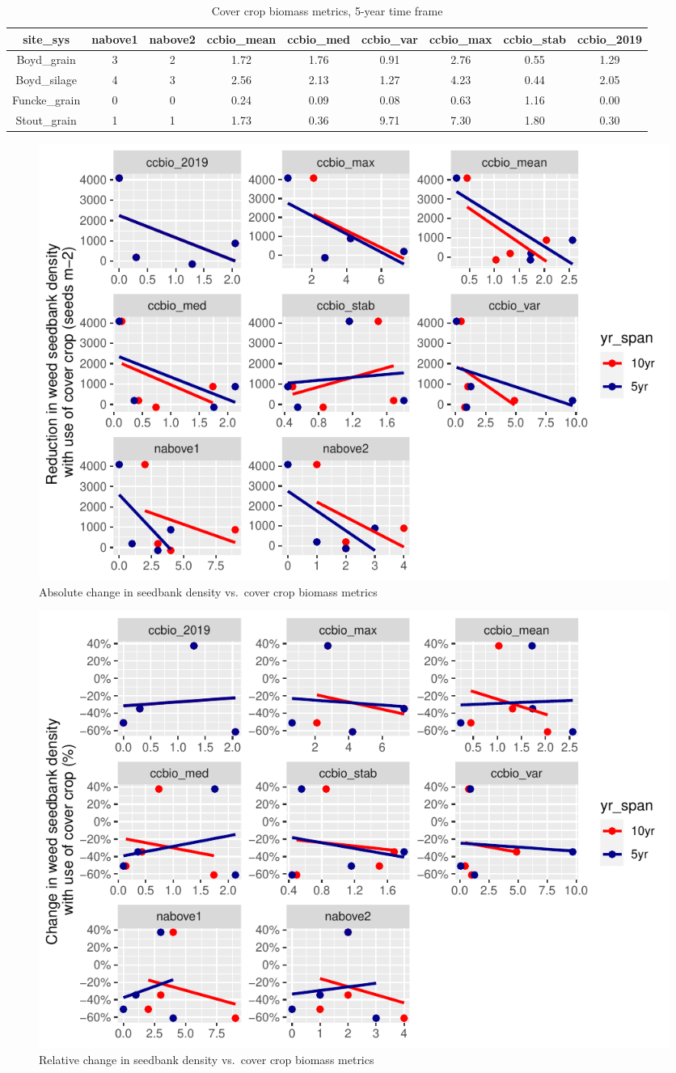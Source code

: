 \documentclass[
]{article}
\begin{document}
\begin{table}[H]

\caption{\label{tab:ccbio5yr}Cover crop biomass metrics, 5-year time frame}
\centering
\begin{tabular}[t]{ccccccccc}
\toprule
site\_sys & nabove1 & nabove2 & ccbio\_mean & ccbio\_med & ccbio\_var & ccbio\_max & ccbio\_stab & ccbio\_2019\\
\midrule
\rowcolor{gray!6}  Boyd\_grain & 3 & 2 & 1.72 & 1.76 & 0.91 & 2.76 & 0.55 & 1.29\\
\cmidrule{1-9}
Boyd\_silage & 4 & 3 & 2.56 & 2.13 & 1.27 & 4.23 & 0.44 & 2.05\\
\cmidrule{1-9}
\rowcolor{gray!6}  Funcke\_grain & 0 & 0 & 0.24 & 0.09 & 0.08 & 0.63 & 1.16 & 0.00\\
\cmidrule{1-9}
Stout\_grain & 1 & 1 & 1.73 & 0.36 & 9.71 & 7.30 & 1.80 & 0.30\\
\bottomrule
\end{tabular}
\end{table}

\begin{figure}
\centering
\includegraphics{supp-mat_files/figure-latex/unnamed-chunk-2-1.pdf}
\caption{Absolute change in seedbank density vs.~cover crop biomass
metrics}
\end{figure}

\begin{figure}
\centering
\includegraphics{supp-mat_files/figure-latex/unnamed-chunk-3-1.pdf}
\caption{Relative change in seedbank density vs.~cover crop biomass
metrics}
\end{figure}
\end{document}
